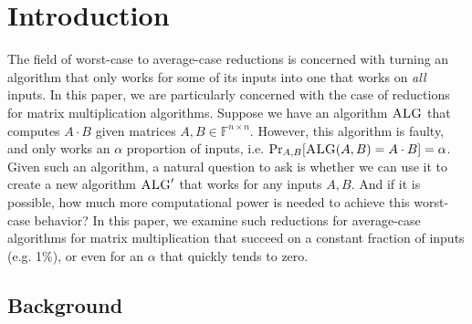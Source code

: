 \documentclass[12pt]{caltech_thesis}
\def\F{\mathbb{F}}
\begin{document}



\tableofcontents

\mainmatter


\chapter{Introduction}
The field of worst-case to average-case reductions is concerned with turning an algorithm that only works for some of its inputs into one that works on \textit{all} inputs. In this paper, we are particularly concerned with the case of reductions for matrix multiplication algorithms. Suppose we have an algorithm $\textsc{ALG}$ that computes $A\cdot B$ given matrices $A, B \in \F^{n \times n}$. However, this algorithm is faulty, and only works an $\alpha$ proportion of inputs, i.e. $\Pr_{A,B}[\textsc{ALG}(A,B) = A\cdot B] = \alpha$. Given such an algorithm, a natural question to ask is whether we can use it to create a new algorithm $\textsc{ALG}'$ that works for any inputs $A,B$. And if it is possible, how much more computational power is needed to achieve this worst-case behavior? In this paper, we examine such reductions for average-case algorithms for matrix multiplication that succeed on a constant fraction of inputs (e.g. 1\%), or even for an $\alpha$ that quickly tends to zero.



\section{Background}
\end{document}
